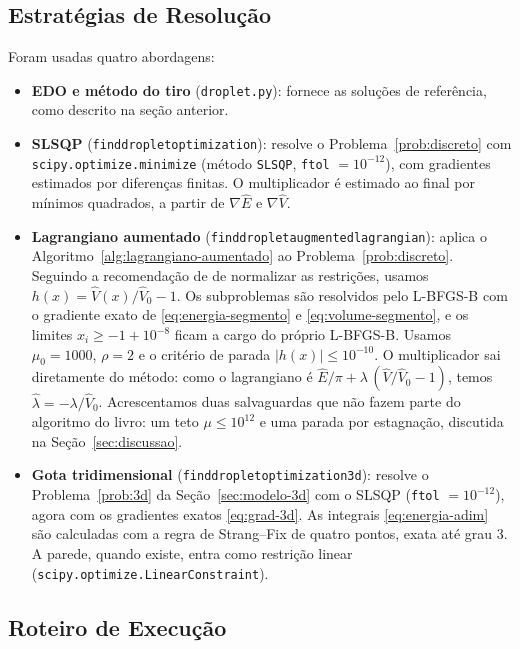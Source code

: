 \documentclass[12pt, oneside, a4paper, english, brazil]{abntex2}
\theoremstyle{relatorio}
\theoremstyle{relatorioit}
\theoremstyle{problema}
\newcommand{\code}[1]{{\renewcommand{\_}{\textunderscore\allowbreak}\texttt{#1}}}
\newcommand{\Vh}{\hat V}
\newcommand{\lh}{\hat\lambda}
\newcommand{\Eh}{\hat E}
\begin{document}
\subsection{Estratégias de Resolução}

Foram usadas quatro abordagens:

\begin{itemize}
  \item \textbf{EDO e método do tiro} (\code{droplet.py}): fornece as soluções de
    referência, como descrito na seção anterior.
  \item \textbf{SLSQP} (\code{find\_droplet\_optimization}): resolve o
    Problema~\ref{prob:discreto} com \code{scipy.\allowbreak optimize.\allowbreak minimize} (método
    \code{SLSQP}, \code{ftol} $= 10^{-12}$), com gradientes estimados por diferenças
    finitas. O multiplicador é estimado ao final por mínimos quadrados, a partir de
    $\nabla\Eh$ e $\nabla\Vh$.
  \item \textbf{Lagrangiano aumentado} (\code{find\_droplet\_augmented\_lagrangian}):
    aplica o Algoritmo~\ref{alg:lagrangiano-aumentado} ao Problema~\ref{prob:discreto}.
    Seguindo a recomendação de \textcite[Dica 5.3]{martins2021} de normalizar as
    restrições, usamos $h(x) = \Vh(x)/\Vh_0 - 1$. Os subproblemas são resolvidos pelo
    L-BFGS-B com o gradiente exato de \eqref{eq:energia-segmento} e
    \eqref{eq:volume-segmento}, e os limites $x_i \ge -1 + 10^{-8}$ ficam a cargo do
    próprio L-BFGS-B. Usamos $\mu_0 = 1000$, $\rho = 2$ e o critério de parada
    $|h(x)| \le 10^{-10}$. O multiplicador sai diretamente do método: como o
    lagrangiano é $\Eh/\pi + \lambda\,(\Vh/\Vh_0 - 1)$, temos $\lh = -\lambda/\Vh_0$.
    Acrescentamos duas salvaguardas que não fazem parte do algoritmo do livro: um teto
    $\mu \le 10^{12}$ e uma parada por estagnação, discutida na
    Seção~\ref{sec:discussao}.
  \item \textbf{Gota tridimensional} (\code{find\_droplet\_optimization\_3d}):
    resolve o Problema~\ref{prob:3d} da Seção~\ref{sec:modelo-3d} com o SLSQP
    (\code{ftol} $= 10^{-12}$), agora com os gradientes exatos \eqref{eq:grad-3d}. As
    integrais \eqref{eq:energia-adim} são calculadas com a regra de Strang--Fix de
    quatro pontos, exata até grau 3. A parede, quando existe, entra como restrição
    linear (\code{scipy.optimize.LinearConstraint}).
\end{itemize}

\subsection{Roteiro de Execução}
\end{document}
